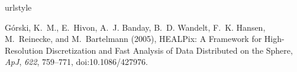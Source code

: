 \documentclass[draft,ras]{AGUJournal}
\begin{document}
\begin{thebibliography}{1}
\providecommand{\natexlab}[1]{#1}
\expandafter\ifx\csname urlstyle\endcsname\relax
  \providecommand{\doi}[1]{doi:\discretionary{}{}{}#1}\else
  \providecommand{\doi}{doi:\discretionary{}{}{}\begingroup
  \urlstyle{rm}\Url}\fi

{G{\'o}rski}, K.~M., E.~{Hivon}, A.~J. {Banday}, B.~D. {Wandelt}, F.~K.
  {Hansen}, M.~{Reinecke}, and M.~{Bartelmann} (2005), {HEALPix: A Framework
  for High-Resolution Discretization and Fast Analysis of Data Distributed on
  the Sphere}, \textit{ApJ}, \textit{622}, 759--771, \doi{10.1086/427976}.

\end{thebibliography}




\listofchanges
\end{document}
